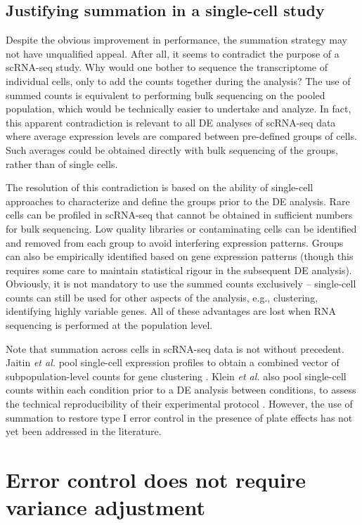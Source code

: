 \documentclass{article}
\begin{document}
\subsection{Justifying summation in a single-cell study}
Despite the obvious improvement in performance, the summation strategy may not have unqualified appeal.
After all, it seems to contradict the purpose of a scRNA-seq study. 
Why would one bother to sequence the transcriptome of individual cells, only to add the counts together during the analysis?
The use of summed counts is equivalent to performing bulk sequencing on the pooled population, which would be technically easier to undertake and analyze.
In fact, this apparent contradiction is relevant to all DE analyses of scRNA-seq data where average expression levels are compared between pre-defined groups of cells.
Such averages could be obtained directly with bulk sequencing of the groups, rather than of single cells.

The resolution of this contradiction is based on the ability of single-cell approaches to characterize and define the groups prior to the DE analysis.
Rare cells can be profiled in scRNA-seq that cannot be obtained in sufficient numbers for bulk sequencing.
Low quality libraries or contaminating cells can be identified and removed from each group to avoid interfering expression patterns.
Groups can also be empirically identified based on gene expression patterns (though this requires some care to maintain statistical rigour in the subsequent DE analysis).
Obviously, it is not mandatory to use the summed counts exclusively 
-- single-cell counts can still be used for other aspects of the analysis, e.g., clustering, identifying highly variable genes.
All of these advantages are lost when RNA sequencing is performed at the population level.

Note that summation across cells in scRNA-seq data is not without precedent.
Jaitin \textit{et al.} pool single-cell expression profiles to obtain a combined vector of subpopulation-level counts for gene clustering \cite{jaitin2014massively}.
Klein \textit{et al.} also pool single-cell counts within each condition prior to a DE analysis between conditions,
    to assess the technical reproducibility of their experimental protocol \cite{klein2015droplet}.
However, the use of summation to restore type I error control in the presence of plate effects has not yet been addressed in the literature.

\section{Error control does not require variance adjustment}
\end{document}
